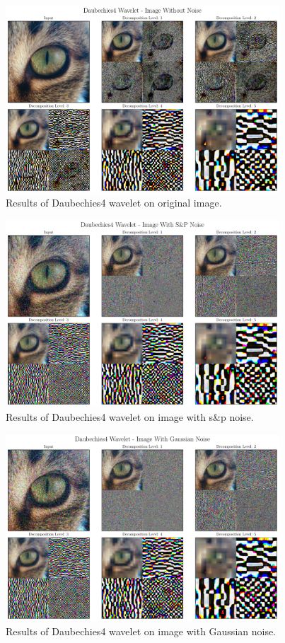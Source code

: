 \documentclass[12pt]{article}
\begin{document}
	\begin{figure}[!h]
		\centering
		\includegraphics[height=7cm]{../Tests/Outputs/2D_Daubechies4Wavelet_WithoutNoise.pdf}
		\caption{Results of Daubechies4 wavelet on original image.}
		\label{fig:2d_db4}
	\end{figure}
	
	\begin{figure}[!h]
		\centering
		\includegraphics[height=7cm]{../Tests/Outputs/2D_Daubechies4Wavelet_SPNoise.pdf}
		\caption{Results of Daubechies4 wavelet on image with s\&p noise.}
		\label{fig:2d_db4_sp}
	\end{figure}
	
	\begin{figure}[!h]
		\centering
		\includegraphics[height=7cm]{../Tests/Outputs/2D_Daubechies4Wavelet_GaussianNoise.pdf}
		\caption{Results of Daubechies4 wavelet on image with Gaussian noise.}
		\label{fig:2d_db4_gs}
	\end{figure}
	
\end{document}
